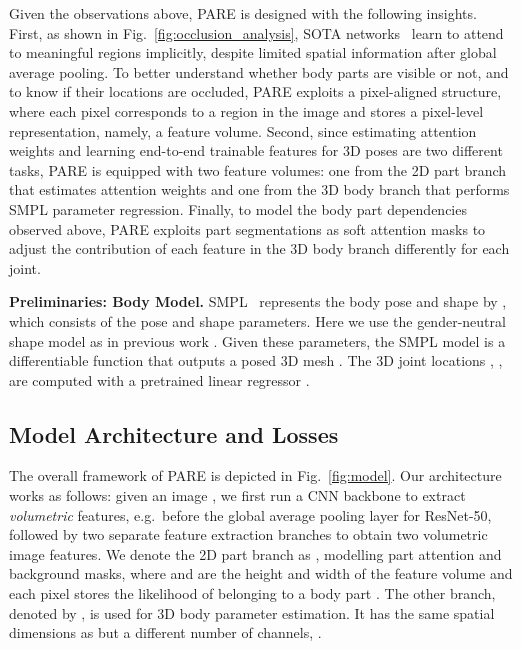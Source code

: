 \documentclass[10pt,twocolumn,letterpaper,usenames,dvipsnames]{article}
\newcommand{\methodname}{PARE\xspace}
\renewcommand{\eg}{e.g.\xspace}
\begin{document}
Given the observations above, {\methodname} is designed with the following insights.
First, as shown in Fig.~\ref{fig:occlusion_analysis}, SOTA networks~\cite{kanazawa_hmr,kocabas2019vibe,SPIN:ICCV:2019} learn to attend to meaningful regions implicitly, despite limited spatial information after global average pooling.
To better understand whether body parts are visible or not, and to know if their locations are occluded, {\methodname} exploits a pixel-aligned structure, where each pixel corresponds to a region in the image and stores a pixel-level representation, namely, a feature volume.
Second, since estimating attention weights and learning end-to-end trainable features for 3D poses are two different tasks, {\methodname} is equipped with two feature volumes: one from the 2D part branch that estimates attention weights and one from the 3D body branch that performs SMPL parameter regression.
Finally, to model the body part dependencies observed above, {\methodname} exploits part segmentations as soft attention masks to adjust the contribution of each feature in the 3D body branch differently for each joint. 

\textbf{Preliminaries: Body Model.}
\label{sec:body_model}
SMPL~\cite{looper_smpl} represents the body pose and shape by , which consists of the pose  and shape  parameters. 
Here we use the gender-neutral shape model as in previous work \cite{kanazawa_hmr,SPIN:ICCV:2019}.
Given these parameters, the SMPL model is a differentiable function that outputs a posed 3D mesh .
The 3D joint locations , , are computed with a pretrained linear regressor .

\subsection{Model Architecture and Losses}
\label{sec:model}
The overall framework of {\methodname} is depicted in Fig.~\ref{fig:model}. 
Our architecture works as follows: given an image , we first run a CNN backbone to extract \emph{volumetric} features, \eg~before the global average pooling layer
for ResNet-50, followed by two separate feature extraction branches to obtain two volumetric image features. 
We denote the 2D part branch as , modelling  part attention and  background masks, where  and  are the height and width of the feature volume and each pixel  stores the likelihood 
of belonging to a body part . 
The other branch, denoted by , is used for 3D body parameter estimation.
It has the same spatial dimensions  as  but a different number of channels, .
\end{document}
